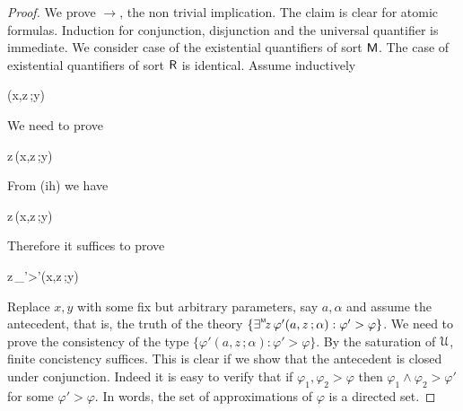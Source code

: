 \documentclass[11pt,oneside]{amsart}
\begin{document}
\begin{proof}
  We prove $\rightarrow$, the non trivial implication.
  The claim is clear for atomic formulas.
  Induction for conjunction, disjunction and the universal quantifier is immediate.
%
%
%
%
%
  We consider case of the existential quantifiers of sort ${\sf M}$.
  The case of existential quantifiers of sort ${\sf R}$ is identical.
  Assume inductively
  
  {\rightarrow}
  {\varphi(x,z\,;y)}

  We need to prove

  {\rightarrow}
  {\existsM z\,\varphi(x,z\,;y)}

  From (ih) we have

  {\rightarrow}
  {\existsM z\,\varphi(x,z\,;y)}

  Therefore it suffices to prove

  {\rightarrow}
  {\existsM z\,\bigwedge_{\varphi'>\varphi}\varphi'(x,z\,;y)}

Replace $x,y$ with some fix but arbitrary parameters, say $a,\alpha$ and assume the antecedent, that is, the truth of the theory $\{\existsM z\,\varphi'(a,z\,;\alpha):\varphi'>\varphi\}$.
We need to prove the consistency of the type $\{\varphi'(a,z\,;\alpha):\varphi'>\varphi\}$.
By the saturation of ${\EuScript U}$, finite concistency suffices.
This is clear if we show that the antecedent is closed under conjunction.
Indeed it is easy to verify that if $\varphi_1,\varphi_2>\varphi$ then $\varphi_1\wedge\varphi_2>\varphi'$ for some $\varphi'>\varphi$.
In words, the set of approximations of $\varphi$ is a directed set.
%
%
%
%
%
\end{proof}
\end{document}
